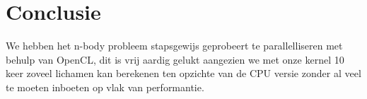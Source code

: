 \documentclass{article}
\begin{document}
\section{Conclusie}

We hebben het n-body probleem stapsgewijs geprobeert te parallelliseren met behulp
van OpenCL, dit is vrij aardig gelukt aangezien we met onze kernel 10 keer zoveel lichamen
kan berekenen ten opzichte van de CPU versie zonder al veel te moeten inboeten op vlak
van performantie.
\end{document}
